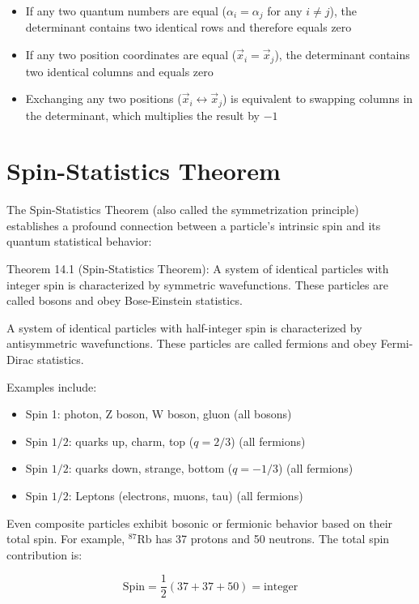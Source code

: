 \begin{itemize}
  \item If any two quantum numbers are equal ($\alpha_i=\alpha_j$ for any $i\neq j$), the determinant contains two identical rows and therefore equals zero
  \item If any two position coordinates are equal ($\vec{x}_i=\vec{x}_j$), the determinant contains two identical columns and equals zero
  \item Exchanging any two positions ($\vec{x}_i \leftrightarrow \vec{x}_j$) is equivalent to swapping columns in the determinant, which multiplies the result by $-1$
\end{itemize}

\section{Spin-Statistics Theorem}
The Spin-Statistics Theorem (also called the symmetrization principle) establishes a profound connection between a particle's intrinsic spin and its quantum statistical behavior:

Theorem 14.1 (Spin-Statistics Theorem): A system of identical particles with integer spin is characterized by symmetric wavefunctions. These particles are called bosons and obey Bose-Einstein statistics.

A system of identical particles with half-integer spin is characterized by antisymmetric wavefunctions. These particles are called fermions and obey Fermi-Dirac statistics.

Examples include:
\begin{itemize}
  \item Spin 1: photon, Z boson, W boson, gluon (all bosons)
  \item Spin $1/2$: quarks up, charm, top ($q=2/3$) (all fermions)
  \item Spin $1/2$: quarks down, strange, bottom ($q=-1/3$) (all fermions)
  \item Spin $1/2$: Leptons (electrons, muons, tau) (all fermions)
\end{itemize}

Even composite particles exhibit bosonic or fermionic behavior based on their total spin. For example, $^{87}$Rb has 37 protons and 50 neutrons. The total spin contribution is:

\begin{equation}
\text{Spin}=\frac{1}{2}(37+37+50)=\text{integer}
\end{equation}

